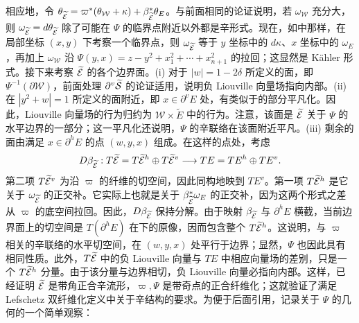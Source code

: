 相应地，令 $\theta_{\widetilde{\mathcal E}}=\varpi^*(\theta_{\mathcal W}+\kappa)+\beta_{\widetilde{\mathcal E}}^*\theta_E$。与前面相同的论证说明，若 $\omega_{\mathcal W}$ 充分大，则 $\omega_{\widetilde{\mathcal E}}=d\theta_{\widetilde{\mathcal E}}$ 除了可能在
$\Psi$ 的临界点附近以外都是辛形式。现在，如中那样，在局部坐标 $(x,y)$ 下考察一个临界点，则 $\omega_{\widetilde{\mathcal E}}$ 等于 $y$ 坐标中的 $d\kappa$、$x$ 坐标中的 $\omega_E$，再加上 $\omega_{\mathcal W}$ 沿 $\Psi(y,x)=z-y^2+x_1^2+\cdots+x_{n+1}^2$ 的拉回；这显然是 Kähler 形式。接下来考察 $\widetilde{\mathcal E}$ 的各个边界面。(i) 对于 $|w|=1-2\delta$ 所定义的面，即 $\Psi^{-1}(\partial\mathcal W)$，前面处理 $\partial^v\widetilde{\mathcal S}$ 的论证适用，说明负 Liouville 向量场指向内部。(ii) 在 $|y^2+w|=1$ 所定义的面附近，即 $x\in\partial^vE$ 处，有类似于的部分平凡化。因此，Liouville 向量场的行为归约为 $\mathcal W\times\widetilde E$ 中的行为。注意，该面是 $\widetilde{\mathcal E}$ 关于 $\Psi$ 的水平边界的一部分；这一平凡化还说明，$\Psi$ 的辛联络在该面附近平凡。(iii) 剩余的面由满足 $x\in\partial^hE$ 的点 $(w,y,x)$ 组成。在这样的点处，考虑
\begin{equation}\label{eq:18.11}
D\beta_{\widetilde{\mathcal E}}:T\widetilde{\mathcal E}=T\widetilde{\mathcal E}^h\oplus T\widetilde{\mathcal E}^v\longrightarrow TE=TE^h\oplus TE^v.
\end{equation}
第二项 $T\widetilde{\mathcal E}^v$ 为沿 $\varpi$ 的纤维的切空间，因此同构地映到 $TE^v$。第一项 $T\widetilde{\mathcal E}^h$ 是它关于 $\omega_{\widetilde{\mathcal E}}$ 的正交补。它实际上也就是关于 $\beta_{\widetilde{\mathcal E}}^*\omega_E$ 的正交补，因为这两个形式之差从 $\varpi$ 的底空间拉回。因此，$D\beta_{\widetilde{\mathcal E}}$ 保持分解。由于映射 $\beta_{\widetilde{\mathcal E}}$ 与 $\partial^hE$ 横截，当前边界面上的切空间是 $T(\partial^hE)$ 在下的原像，因而包含整个 $T\widetilde{\mathcal E}^h$。这说明，与 $\varpi$ 相关的辛联络的水平切空间，在 $(w,y,x)$ 处平行于边界；显然，$\Psi$ 也因此具有相同性质。此外，$T\widetilde{\mathcal E}$ 中的负 Liouville 向量与 $TE$ 中相应向量场的差别，只是一个 $T\widetilde{\mathcal E}^h$ 分量。由于该分量与边界相切，负 Liouville 向量必指向内部。这样，已经证明 $\widetilde{\mathcal E}$ 是带角正合辛流形，$\varpi,\Psi$ 是带奇点的正合纤维化；这就验证了满足 Lefschetz 双纤维化定义中关于辛结构的要求。为便于后面引用，记录关于 $\Psi$ 的几何的一个简单观察：

